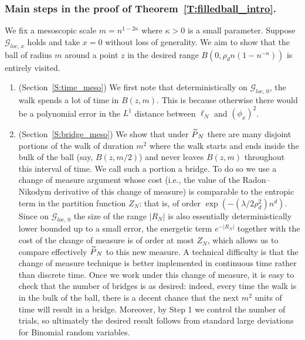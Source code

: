 \documentclass[AHL, Unicode, longabstracts, published]{cedram}
\newcommand{\cG}{\mathcal{G}}
\newcommand*{\romanenumi}{\renewcommand*{\theenumi}{\roman{enumi}}}
\let\oldtilde\tilde
\renewcommand*{\tilde}[1]{\mathchoice{\widetilde{#1}}{\widetilde{#1}}{\oldtilde{#1}}{\oldtilde{#1}}}\let\oldhat\hat
\renewcommand*{\hat}[1]{\mathchoice{\widehat{#1}}{\widehat{#1}}{\oldhat{#1}}{\oldhat{#1}}}\let\oldexists\exists
\renewcommand*{\exists}{\mathrel{\oldexists}}
\begin{document}
\subsubsection{Main steps in the proof of Theorem~\ref{T:filledball_intro}.}
We fix a mesoscopic scale $m = n^{1- 2\kappa}$ where $\kappa>0$ is a small parameter. Suppose $\cG_{loc,\,x}$ holds and take $x = 0$ without loss of generality. We aim to show that the ball of radius $m$ around a point $z$ in the desired range $B(0, \rho_d n (1- n^{ - \kappa}))$ is entirely visited.
\begin{enumerate}\romanenumi
\item \label{list.2.3.1.1}(Section~\ref{S:time_meso}) We first note that deterministically on $\cG_{loc,\,0}$, the walk spends a lot of time in $B(z, m)$. This is because otherwise there would be a polynomial error in the $L^1$ distance between $\ell_N$ and $(\phi_x)^2$.

\item \label{list.2.3.1.2} (Section~\ref{S:bridge_meso}) We show that under $\tilde P_N$ there are many disjoint portions of the walk of duration $m^2$ where the walk starts and ends inside the bulk of the ball (say, $B(z, m/2)$) and never leaves $B(z,m)$ throughout this interval of time. We call such a portion a bridge. To do so we use a change of measure argument whose cost (i.e., the value of the Radon--Nikodym derivative of this change of measure) is comparable to the entropic term in the partition function $Z_N$: that is, of order $\exp(- (\lambda /2 \rho_d^2) n^d)$. Since on $\cG_{loc,\,0}$ the size of the range $|R_N|$ is also essentially deterministically lower bounded up to a small error, the energetic term $e^{- |R_N|}$ together with the cost of the change of measure is of order at most $Z_N$, which allows us to compare effectively $\tilde P_N$ to this new measure. A technical difficulty is that the change of measure technique is better implemented in continuous time rather than discrete time. Once we work under this change of measure, it is easy to check that the number of bridges is as desired: indeed, every time the walk is in the bulk of the ball, there is a decent chance that the next $m^2$ units of time will result in a bridge. Moreover, by Step 1 we control the number of trials, so ultimately the desired result follows from standard large deviations for Binomial random variables.


\end{enumerate}
\end{document}
